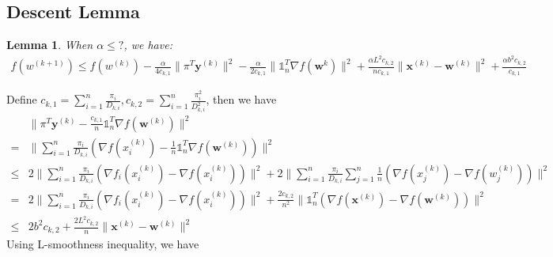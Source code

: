 \documentclass[10pt]{article}
\newtheorem{lemma}[thm]{Lemma}
\newcommand{\vw}{{\mathbf{w}}}
\newcommand{\vx}{{\mathbf{x}}}
\newcommand{\vy}{{\mathbf{y}}}
\begin{document}
\subsection{Descent Lemma}

\begin{lemma}
When $\alpha\le ?$, we have:
    \begin{align}
        f(w^{(k+1)})\le f(w^{(k)})-\frac{\alpha}{4c_{k,1}}\|\pi^T\vy^{(k)}\|^2-\frac{\alpha}{2c_{k,1}}\|\mathds{1}_n^T\nabla f(\vw^{k})\|^2+\frac{\alpha L^2c_{k,2}}{nc_{k,1}}\|\vx^{(k)}-\vw^{(k)}\|^2+\frac{\alpha b^2c_{k,2}}{c_{k,1}} 
    \end{align}
\end{lemma}

Define $c_{k,1}=\sum_{i=1}^n\frac{\pi_i}{D_{k,i}},c_{k,2}=\sum_{i=1}^n\frac{\pi_i^2}{D_{k,i}^2}$, then we have 
\begin{align}\label{Des-1}
    &\|\pi^T\vy^{(k)}-\frac{c_{k,1}}{n}\mathds{1}_n^T\nabla f(\vw^{(k)})\|^2 \nonumber \\
    =&\|\sum_{i=1}^n\frac{\pi_i}{D_{k,i}}(\nabla f(x_i^{(k)})-\frac{1}{n}\mathds{1}_n^T\nabla f(\vw^{(k)}))\|^2 \nonumber \\
    \le& 2\|\sum_{i=1}^n\frac{\pi_i}{D_{k,i}}(\nabla f_i(x_i^{(k)})-\nabla f(x_i^{(k)}))\|^2+2\|\sum_{i=1}^n\frac{\pi_i}{D_{k,i}}\sum_{j=1}^n\frac{1}{n}(\nabla f(x_j^{(k)})-\nabla f(w_j^{(k)}))\|^2\nonumber \\
    =& 2\|\sum_{i=1}^n\frac{\pi_i}{D_{k,i}}(\nabla f_i(x_i^{(k)})-\nabla f(x_i^{(k)}))\|^2+\frac{2c_{k,2}}{n^2}\|\mathds{1}_n^T\left(\nabla f(\vx^{(k)})-\nabla f(\vw^{(k)})\right) \|^2 \nonumber \\
    \le &2b^2c_{k,2}+\frac{2L^2c_{k,2}}{n}\|\vx^{(k)}-\vw^{(k)}\|^2
\end{align}
Using L-smoothness inequality, we have
\end{document}
